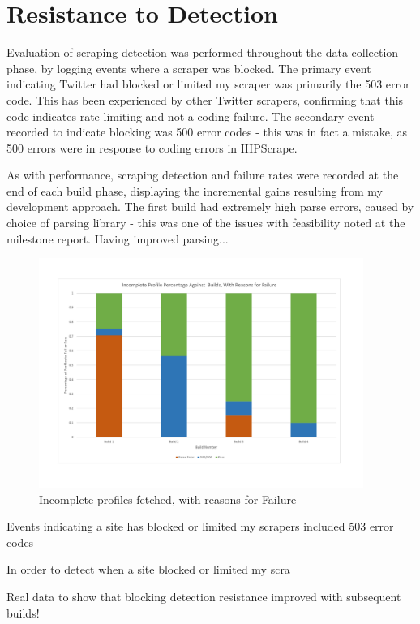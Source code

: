 
\section{Resistance to Detection}

Evaluation of scraping detection was performed throughout the data collection phase, by logging events where a scraper was blocked. The primary event indicating Twitter had blocked or limited my scraper was primarily the 503 error code. This has been experienced by other Twitter scrapers, confirming that this code indicates rate limiting and not a coding failure. The secondary event recorded to indicate blocking was 500 error codes - this was in fact a mistake, as 500 errors were in response to coding errors in IHPScrape. 

As with performance, scraping detection and failure rates were recorded at the end of each build phase, displaying the incremental gains resulting from my development approach. The first build had extremely high parse errors, caused by choice of parsing library - this was one of the issues with feasibility noted at the milestone report. Having improved parsing... %

\begin{figure}[h!]
\centering
\includegraphics[width=400px]{Images/failure_rate_and_reason.pdf}
\caption{Incomplete profiles fetched, with reasons for Failure}
\end{figure}

Events indicating a site has blocked or limited my scrapers included 503 error codes

In order to detect when a site blocked or limited my scra

Real data to show that blocking detection resistance improved with subsequent builds!

